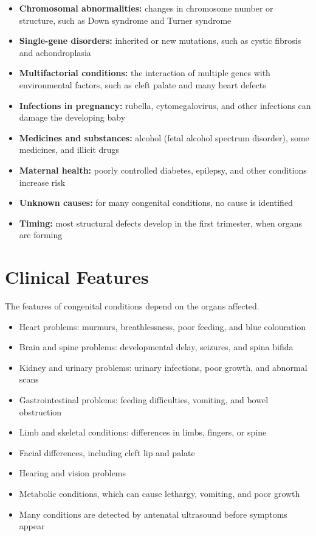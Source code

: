 \begin{itemize}
    \item \textbf{Chromosomal abnormalities:} changes in chromosome number or structure, such as Down syndrome and Turner syndrome
    \item \textbf{Single-gene disorders:} inherited or new mutations, such as cystic fibrosis and achondroplasia
    \item \textbf{Multifactorial conditions:} the interaction of multiple genes with environmental factors, such as cleft palate and many heart defects
    \item \textbf{Infections in pregnancy:} rubella, cytomegalovirus, and other infections can damage the developing baby
    \item \textbf{Medicines and substances:} alcohol (fetal alcohol spectrum disorder), some medicines, and illicit drugs
    \item \textbf{Maternal health:} poorly controlled diabetes, epilepsy, and other conditions increase risk
    \item \textbf{Unknown causes:} for many congenital conditions, no cause is identified
    \item \textbf{Timing:} most structural defects develop in the first trimester, when organs are forming
\end{itemize}

\section*{Clinical Features}
The features of congenital conditions depend on the organs affected.

\begin{itemize}
    \item Heart problems: murmurs, breathlessness, poor feeding, and blue colouration
    \item Brain and spine problems: developmental delay, seizures, and spina bifida
    \item Kidney and urinary problems: urinary infections, poor growth, and abnormal scans
    \item Gastrointestinal problems: feeding difficulties, vomiting, and bowel obstruction
    \item Limb and skeletal conditions: differences in limbs, fingers, or spine
    \item Facial differences, including cleft lip and palate
    \item Hearing and vision problems
    \item Metabolic conditions, which can cause lethargy, vomiting, and poor growth
    \item Many conditions are detected by antenatal ultrasound before symptoms appear
\end{itemize}

